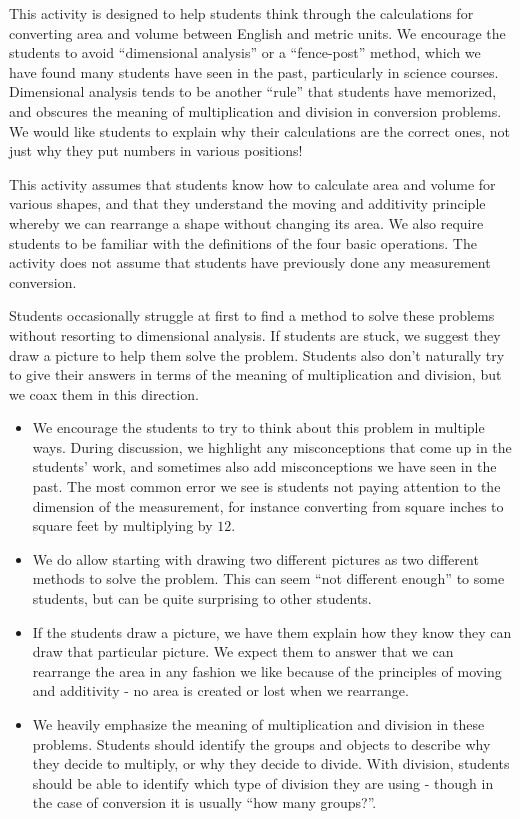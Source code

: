 \documentclass[nooutcomes]{ximera}
\begin{document}
\newpage
\begin{instructorNotes}

This activity is designed to help students think through the calculations for converting area and volume between English and metric units.  We encourage the students to avoid ``dimensional analysis'' or a ``fence-post'' method, which we have found many students have seen in the past, particularly in science courses.  Dimensional analysis tends to be another ``rule'' that students have memorized, and obscures the meaning of multiplication and division in conversion problems.  We would like students to explain why their calculations are the correct ones, not just why they put numbers in various positions!

This activity assumes that students know how to calculate area and volume for various shapes, and that they understand the moving and additivity principle whereby we can rearrange a shape without changing its area.  We also require students to be familiar with the definitions of the four basic operations. The activity does not assume that students have previously done any measurement conversion.

Students occasionally struggle at first to find a method to solve these problems without resorting to dimensional analysis.  If students are stuck, we suggest they draw a picture to help them solve the problem.  Students also don't naturally try to give their answers in terms of the meaning of multiplication and division, but we coax them in this direction.
\begin{itemize}
	\item We encourage the students to try to think about this problem in multiple ways.  During discussion, we highlight any misconceptions that come up in the students' work, and sometimes also add misconceptions we have seen in the past.  The most common error we see is students not paying attention to the dimension of the measurement, for instance converting from square inches to square feet by multiplying by $12$.
	\item We do allow starting with drawing two different pictures as two different methods to solve the problem.  This can seem ``not different enough'' to some students, but can be quite surprising to other students.
	\item If the students draw a picture, we have them explain how they know they can draw that particular picture.  We expect them to answer that we can rearrange the area in any fashion we like because of the principles of moving and additivity - no area is created or lost when we rearrange. 
	\item We heavily emphasize the meaning of multiplication and division in these problems.  Students should identify the groups and objects to describe why they decide to multiply, or why they decide to divide.  With division, students should be able to identify which type of division they are using - though in the case of conversion it is usually ``how many groups?''.
\end{itemize}





\end{instructorNotes}
\end{document}
